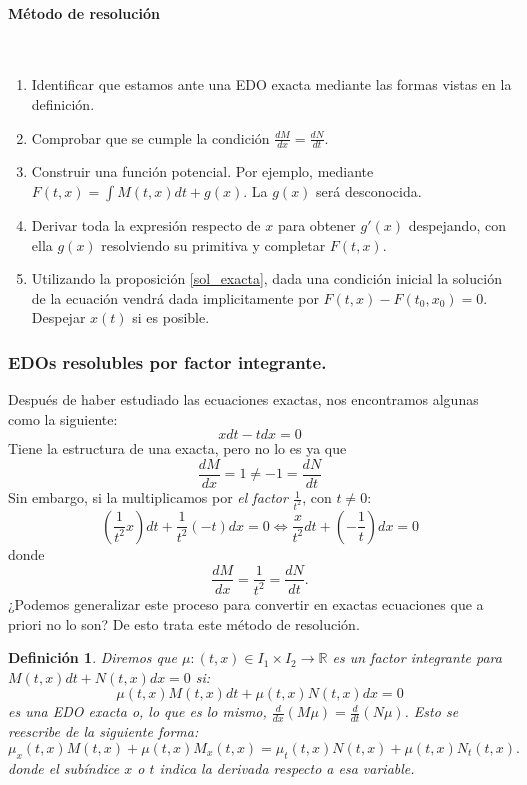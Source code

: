 \documentclass[11pt, a4paper,twoside]{article}
\newcommand{\iindex}[1]{\emph{#1}\index{#1}}
\theoremstyle{theorem-style}  %
\theoremstyle{definition-style}
\newtheorem{definition}{Definición}[section]
\theoremstyle{example-style}
\begin{document}
\paragraph{Método de resolución} \ 
\begin{enumerate}
	\item Identificar que estamos ante una EDO exacta mediante las formas vistas en la definición.
	\item Comprobar que se cumple la condición $\frac{dM}{dx} = \frac{dN}{dt}$.
	\item Construir una función potencial. Por ejemplo, mediante $ F(t,x)=\int M(t, x)dt + g(x) $. La $ g(x) $ será desconocida.
	\item Derivar toda la expresión respecto de $ x $ para obtener $ g'(x) $ despejando, con ella $ g(x) $ resolviendo su primitiva y completar $ F(t,x) $.
	\item Utilizando la proposición \ref{sol_exacta}, dada una condición inicial la solución de la ecuación vendrá dada implicitamente por $F(t, x) - F(t_0, x_0) = 0$. Despejar $ x(t) $ si es posible. 
\end{enumerate}
\subsubsection{EDOs resolubles por factor integrante.}
Después de haber estudiado las ecuaciones exactas, nos encontramos algunas como la siguiente:
\[ xdt - tdx = 0 \] 
Tiene la estructura de una exacta, pero no lo es ya que 
\[ \frac{dM}{dx}=1\neq-1=\frac{dN}{dt} \]
Sin embargo, si la multiplicamos por \textit{el factor} $\frac{1}{t^2}$, con $t \neq 0$:
\[(\frac{1}{t^2}x)dt + \frac{1}{t^2}(-t)dx = 0 \Leftrightarrow \frac{x}{t^2}dt + (-\frac{1}{t})dx = 0\]
donde
\[\frac{dM}{dx} = \frac{1}{t^2} = \frac{dN}{dt}.\]
¿Podemos generalizar este proceso para convertir en exactas ecuaciones que a priori no lo son? De esto trata este método de resolución.
\begin{definition}
	Diremos que $\mu : (t, x) \in I_1 \times I_2 \longrightarrow \mathbb{R}$ es un \iindex{factor integrante} para $M(t, x)dt + N(t, x)dx = 0$ si:
	\[\mu(t, x)M(t, x)dt + \mu(t, x)N(t, x)dx = 0\]
	es una EDO exacta o, lo que es lo mismo, $\frac{d}{dx}(M\mu) = \frac{d}{dt}(N\mu)$. Esto se reescribe de la siguiente forma:
	\begin{equation} \label{eqInte}
	\mu_x(t, x)M(t, x) + \mu(t, x)M_x(t, x) = \mu_t(t, x)N(t, x) + \mu(t, x)N_t(t, x).
	\end{equation}
	donde el subíndice $ x $ o $ t $ indica la derivada respecto a esa variable.
\end{definition}
\end{document}
